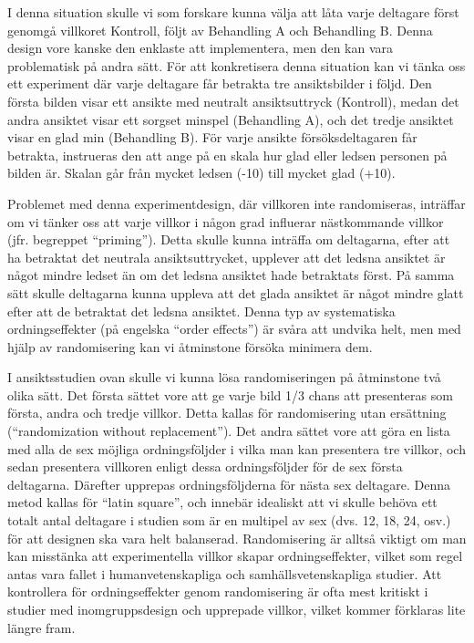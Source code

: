 \documentclass[
]{book}
\begin{document}
I denna situation skulle vi som forskare kunna välja att låta varje deltagare först genomgå villkoret Kontroll, följt av Behandling A och Behandling B. Denna design vore kanske den enklaste att implementera, men den kan vara problematisk på andra sätt. För att konkretisera denna situation kan vi tänka oss ett experiment där varje deltagare får betrakta tre ansiktsbilder i följd. Den första bilden visar ett ansikte med neutralt ansiktsuttryck (Kontroll), medan det andra ansiktet visar ett sorgset minspel (Behandling A), och det tredje ansiktet visar en glad min (Behandling B). För varje ansikte försöksdeltagaren får betrakta, instrueras den att ange på en skala hur glad eller ledsen personen på bilden är. Skalan går från mycket ledsen (-10) till mycket glad (+10).

Problemet med denna experimentdesign, där villkoren inte randomiseras, inträffar om vi tänker oss att varje villkor i någon grad influerar nästkommande villkor (jfr. begreppet ``priming''). Detta skulle kunna inträffa om deltagarna, efter att ha betraktat det neutrala ansiktsuttrycket, upplever att det ledsna ansiktet är något mindre ledset än om det ledsna ansiktet hade betraktats först. På samma sätt skulle deltagarna kunna uppleva att det glada ansiktet är något mindre glatt efter att de betraktat det ledsna ansiktet. Denna typ av systematiska ordningseffekter (på engelska ``order effects'') är svåra att undvika helt, men med hjälp av randomisering kan vi åtminstone försöka minimera dem.

I ansiktsstudien ovan skulle vi kunna lösa randomiseringen på åtminstone två olika sätt. Det första sättet vore att ge varje bild 1/3 chans att presenteras som första, andra och tredje villkor. Detta kallas för randomisering utan ersättning (``randomization without replacement''). Det andra sättet vore att göra en lista med alla de sex möjliga ordningsföljder i vilka man kan presentera tre villkor, och sedan presentera villkoren enligt dessa ordningsföljder för de sex första deltagarna. Därefter upprepas ordningsföljderna för nästa sex deltagare. Denna metod kallas för ``latin square'', och innebär idealiskt att vi skulle behöva ett totalt antal deltagare i studien som är en multipel av sex (dvs. 12, 18, 24, osv.) för att designen ska vara helt balanserad. Randomisering är alltså viktigt om man kan misstänka att experimentella villkor skapar ordningseffekter, vilket som regel antas vara fallet i humanvetenskapliga och samhällsvetenskapliga studier. Att kontrollera för ordningseffekter genom randomisering är ofta mest kritiskt i studier med inomgruppsdesign och upprepade villkor, vilket kommer förklaras lite längre fram.
\end{document}
